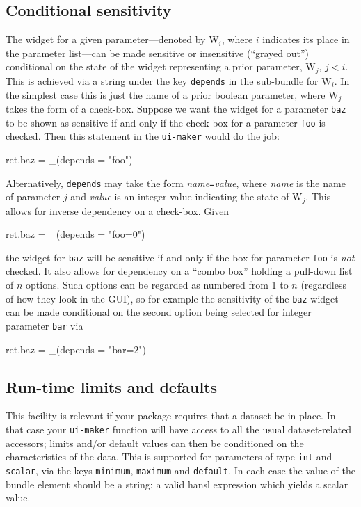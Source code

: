 \documentclass[oneside]{book}
\begin{document}
\subsection{Conditional sensitivity}

The widget for a given parameter---denoted by \textsf{W}$_i$, where
$i$ indicates its place in the parameter list---can be made sensitive
or insensitive (``grayed out'') conditional on the state of the widget
representing a prior parameter, \textsf{W}$_j$, $j<i$. This is
achieved via a string under the key \texttt{depends} in the sub-bundle
for \textsf{W}$_i$.  In the simplest case this is just the name of a
prior boolean parameter, where \textsf{W}$_j$ takes the form of a
check-box. Suppose we want the widget for a parameter \texttt{baz} to
be shown as sensitive if and only if the check-box for a parameter
\texttt{foo} is checked. Then this statement in the \texttt{ui-maker}
would do the job:
\begin{code}
ret.baz = _(depends = "foo")
\end{code}

Alternatively, \texttt{depends} may take the form
\textsl{name}\texttt{=}\textsl{value}, where \textsl{name} is the name
of parameter $j$ and \textit{value} is an integer value indicating the
state of \textsf{W}$_j$.  This allows for inverse dependency on a
check-box.  Given
\begin{code}
ret.baz = _(depends = "foo=0")
\end{code}
the widget for \texttt{baz} will be sensitive if and only if the box
for parameter \texttt{foo} is \textit{not} checked. It also allows for
dependency on a ``combo box'' holding a pull-down list of $n$
options. Such options can be regarded as numbered from 1 to $n$
(regardless of how they look in the GUI), so for example the
sensitivity of the \texttt{baz} widget can be made conditional on the
second option being selected for integer parameter \texttt{bar} via
\begin{code}
ret.baz = _(depends = "bar=2")
\end{code}

\subsection{Run-time limits and defaults}

This facility is relevant if your package requires that a dataset be
in place. In that case your \texttt{ui-maker} function will have
access to all the usual dataset-related accessors; limits and/or
default values can then be conditioned on the characteristics of the
data. This is supported for parameters of type \texttt{int} and
\texttt{scalar}, via the keys \texttt{minimum}, \texttt{maximum} and
\texttt{default}. In each case the value of the bundle element should
be a string: a valid hansl expression which yields a scalar value.
\end{document}

